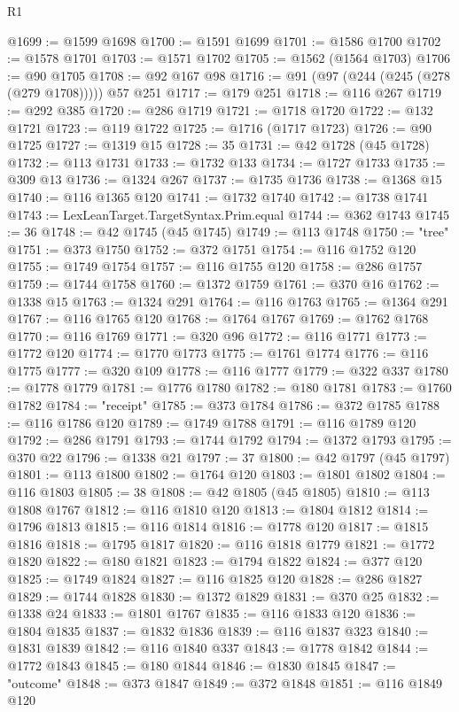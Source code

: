 \begin{lexlean}{R1}
\begin{coremodule}
@1699 := @1599 @1698
@1700 := @1591 @1699
@1701 := @1586 @1700
@1702 := @1578 @1701
@1703 := @1571 @1702
@1705 := @1562 (@1564 @1703)
@1706 := @90 @1705
@1708 := @92 @167 @98
@1716 := @91 (@97 (@244 (@245 (@278 (@279 @1708))))) @57 @251
@1717 := @179 @251
@1718 := @116 @267
@1719 := @292 @385
@1720 := @286 @1719
@1721 := @1718 @1720
@1722 := @132 @1721
@1723 := @119 @1722
@1725 := @1716 (@1717 @1723)
@1726 := @90 @1725
@1727 := @1319 @15
@1728 := 35
@1731 := @42 @1728 (@45 @1728)
@1732 := @113 @1731
@1733 := @1732 @133
@1734 := @1727 @1733
@1735 := @309 @13
@1736 := @1324 @267
@1737 := @1735 @1736
@1738 := @1368 @15
@1740 := @116 @1365 @120
@1741 := @1732 @1740
@1742 := @1738 @1741
@1743 := LexLeanTarget.TargetSyntax.Prim.equal
@1744 := @362 @1743
@1745 := 36
@1748 := @42 @1745 (@45 @1745)
@1749 := @113 @1748
@1750 := "tree"
@1751 := @373 @1750
@1752 := @372 @1751
@1754 := @116 @1752 @120
@1755 := @1749 @1754
@1757 := @116 @1755 @120
@1758 := @286 @1757
@1759 := @1744 @1758
@1760 := @1372 @1759
@1761 := @370 @16
@1762 := @1338 @15
@1763 := @1324 @291
@1764 := @116 @1763
@1765 := @1364 @291
@1767 := @116 @1765 @120
@1768 := @1764 @1767
@1769 := @1762 @1768
@1770 := @116 @1769
@1771 := @320 @96
@1772 := @116 @1771
@1773 := @1772 @120
@1774 := @1770 @1773
@1775 := @1761 @1774
@1776 := @116 @1775
@1777 := @320 @109
@1778 := @116 @1777
@1779 := @322 @337
@1780 := @1778 @1779
@1781 := @1776 @1780
@1782 := @180 @1781
@1783 := @1760 @1782
@1784 := "receipt"
@1785 := @373 @1784
@1786 := @372 @1785
@1788 := @116 @1786 @120
@1789 := @1749 @1788
@1791 := @116 @1789 @120
@1792 := @286 @1791
@1793 := @1744 @1792
@1794 := @1372 @1793
@1795 := @370 @22
@1796 := @1338 @21
@1797 := 37
@1800 := @42 @1797 (@45 @1797)
@1801 := @113 @1800
@1802 := @1764 @120
@1803 := @1801 @1802
@1804 := @116 @1803
@1805 := 38
@1808 := @42 @1805 (@45 @1805)
@1810 := @113 @1808 @1767
@1812 := @116 @1810 @120
@1813 := @1804 @1812
@1814 := @1796 @1813
@1815 := @116 @1814
@1816 := @1778 @120
@1817 := @1815 @1816
@1818 := @1795 @1817
@1820 := @116 @1818 @1779
@1821 := @1772 @1820
@1822 := @180 @1821
@1823 := @1794 @1822
@1824 := @377 @120
@1825 := @1749 @1824
@1827 := @116 @1825 @120
@1828 := @286 @1827
@1829 := @1744 @1828
@1830 := @1372 @1829
@1831 := @370 @25
@1832 := @1338 @24
@1833 := @1801 @1767
@1835 := @116 @1833 @120
@1836 := @1804 @1835
@1837 := @1832 @1836
@1839 := @116 @1837 @323
@1840 := @1831 @1839
@1842 := @116 @1840 @337
@1843 := @1778 @1842
@1844 := @1772 @1843
@1845 := @180 @1844
@1846 := @1830 @1845
@1847 := "outcome"
@1848 := @373 @1847
@1849 := @372 @1848
@1851 := @116 @1849 @120

\end{coremodule}
\end{lexlean}
